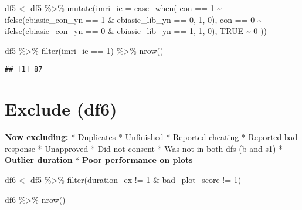 \documentclass[
]{article}
\newenvironment{Shaded}{\begin{snugshade}}{\end{snugshade}}
\newcommand{\AttributeTok}[1]{\textcolor[rgb]{0.77,0.63,0.00}{#1}}
\newcommand{\ConstantTok}[1]{\textcolor[rgb]{0.00,0.00,0.00}{#1}}
\newcommand{\DecValTok}[1]{\textcolor[rgb]{0.00,0.00,0.81}{#1}}
\newcommand{\FunctionTok}[1]{\textcolor[rgb]{0.00,0.00,0.00}{#1}}
\newcommand{\NormalTok}[1]{#1}
\newcommand{\OtherTok}[1]{\textcolor[rgb]{0.56,0.35,0.01}{#1}}
\newcommand{\SpecialCharTok}[1]{\textcolor[rgb]{0.00,0.00,0.00}{#1}}
\begin{document}
\begin{Shaded}
\begin{Highlighting}[]
\NormalTok{df5 }\OtherTok{\textless{}{-}}\NormalTok{ df5 }\SpecialCharTok{\%\textgreater{}\%} 
  \FunctionTok{mutate}\NormalTok{(}\AttributeTok{imri\_ie =} \FunctionTok{case\_when}\NormalTok{(}
\NormalTok{    con }\SpecialCharTok{==} \DecValTok{1} \SpecialCharTok{\textasciitilde{}} \FunctionTok{ifelse}\NormalTok{(ebiasie\_con\_yn }\SpecialCharTok{==} \DecValTok{1} \SpecialCharTok{\&}\NormalTok{ ebiasie\_lib\_yn }\SpecialCharTok{==} \DecValTok{0}\NormalTok{, }\DecValTok{1}\NormalTok{, }\DecValTok{0}\NormalTok{),}
\NormalTok{    con }\SpecialCharTok{==} \DecValTok{0} \SpecialCharTok{\textasciitilde{}} \FunctionTok{ifelse}\NormalTok{(ebiasie\_con\_yn }\SpecialCharTok{==} \DecValTok{0} \SpecialCharTok{\&}\NormalTok{ ebiasie\_lib\_yn }\SpecialCharTok{==} \DecValTok{1}\NormalTok{, }\DecValTok{1}\NormalTok{, }\DecValTok{0}\NormalTok{),}
    \ConstantTok{TRUE} \SpecialCharTok{\textasciitilde{}} \DecValTok{0}
\NormalTok{  ))}

\NormalTok{df5 }\SpecialCharTok{\%\textgreater{}\%} 
  \FunctionTok{filter}\NormalTok{(imri\_ie }\SpecialCharTok{==} \DecValTok{1}\NormalTok{) }\SpecialCharTok{\%\textgreater{}\%} 
  \FunctionTok{nrow}\NormalTok{()}
\end{Highlighting}
\end{Shaded}

\begin{verbatim}
## [1] 87
\end{verbatim}

\hypertarget{exclude-df6}{%
\section{Exclude (df6)}\label{exclude-df6}}

\textbf{Now excluding:} * Duplicates * Unfinished * Reported cheating *
Reported bad response * Unapproved * Did not consent * Was not in both
dfs (b and s1) * \textbf{Outlier duration} * \textbf{Poor performance on
plots}

\begin{Shaded}
\begin{Highlighting}[]
\NormalTok{df6 }\OtherTok{\textless{}{-}}\NormalTok{ df5 }\SpecialCharTok{\%\textgreater{}\%} 
  \FunctionTok{filter}\NormalTok{(duration\_ex }\SpecialCharTok{!=} \DecValTok{1} \SpecialCharTok{\&}\NormalTok{ bad\_plot\_score }\SpecialCharTok{!=} \DecValTok{1}\NormalTok{)}

\NormalTok{df6 }\SpecialCharTok{\%\textgreater{}\%} 
  \FunctionTok{nrow}\NormalTok{()}
\end{Highlighting}
\end{Shaded}
\end{document}
